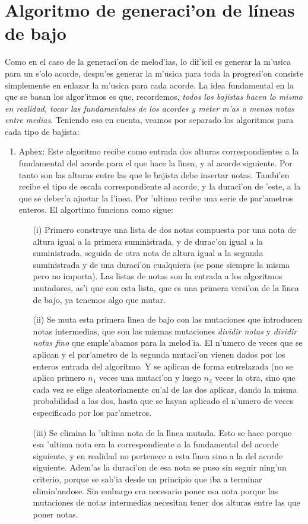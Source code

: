\section{Algoritmo de generaci'on de l\'ineas de bajo}
Como en el caso de la generaci'on de melod'ias, lo dif'icil es generar la m'usica para un s'olo acorde, despu'es generar la m'usica para toda la progresi'on consiste simplemente en enlazar la m'usica para cada acorde. La idea fundamental en la que se basan los algor'itmos es que, recordemos, \emph{todos los bajistas hacen lo mismo en realidad, tocar las fundamentales de los acordes y meter m'as o menos notas entre medias}. Teniendo eso en cuenta, veamos por separado los algoritmos para cada tipo de bajista:
	\begin{enumerate}
	\item Aphex: Este algoritmo recibe como entrada dos alturas correspondientes a la fundamental del acorde para el que hace la l\'\i nea, y al acorde siguiente. Por tanto son las alturas entre las que le bajista debe insertar notas. Tambi'en recibe  el tipo de escala correspondiente al acorde, y la duraci'on de 'este, a la que se deber'a ajustar la l'inea. Por 'ultimo recibe una serie de par'ametros enteros. El algortimo funciona como sigue:
		\begin{enumerate}
		\item[(i)] Primero construye una lista de dos notas compuesta por una nota de altura igual a la primera suministrada, y de durac'on igual a la suministrada, seguida de otra nota de altura igual a la segunda suministrada y de una duraci'on cualquiera (se pone siempre la misma pero no importa). Las listas de notas son la entrada a los algoritmos mutadores, as'i que con esta lista, que es una primera versi'on de la l\'\i nea de bajo, ya tenemos algo que mutar.
		\item[(ii)] Se muta esta primera l\'\i nea de bajo con las mutaciones que introducen notas intermedias, que son las mismas mutaciones \emph{dividir notas} y \emph{dividir notas fino} que emple'abamos para la melod'ia. El n'umero de veces que se aplican y el par'ametro de la segunda mutaci'on vienen dados por los enteros entrada del algoritmo. Y se aplican de forma entrelazada (no se aplica primero $n_{1}$ veces una mutaci'on y luego $n_{2}$ veces la otra, sino que cada vez se elige aleatoriamente cu'al de las dos aplicar, dando la misma probabilidad a las dos, hasta que se hayan aplicado el n'umero de veces especificado por los par'ametros.
		\item[(iii)] Se elimina la 'ultima nota de la l\'\i nea mutada. Esto se hace porque esa 'ultima nota era la correspondiente a la fundamental del acorde siguiente, y en realidad no pertenece a esta l\'\i nea sino a la del acorde siguiente. Adem'as la duraci'on de esa nota se puso sin seguir ning'un criterio, porque se sab'ia desde un principio que iba a terminar elimin'andose. Sin embargo era necesario poner esa nota porque las mutaciones de notas intermedias necesitan tener dos alturas entre las que poner notas.

\end{enumerate}
\end{enumerate}
